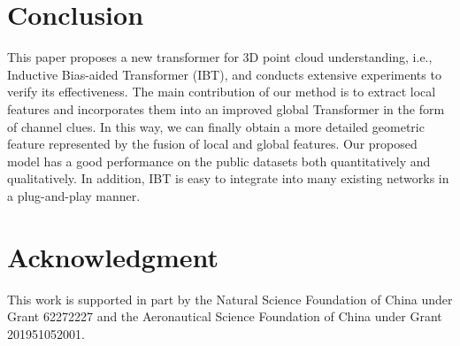 \documentclass[conference]{IEEEtran}
\begin{document}
\vspace{-3mm}
\begin{table}[h]
\caption{Ablation experiments for different options within the module.}
\centering
\vspace{-2mm}

\label{ab_in}
\end{table}




\vspace{-0.5cm}

\section{Conclusion} This paper proposes a new transformer for 3D point cloud understanding, i.e., Inductive Bias-aided Transformer (IBT), and conducts extensive experiments to verify its effectiveness. The main contribution of our method is to extract local features and incorporates them into  an improved global Transformer in the form of channel clues. In this way, we can finally obtain a more detailed geometric feature represented by the fusion of local and global features. Our proposed model has a good performance on the public datasets both quantitatively and qualitatively. In addition, IBT is easy to integrate into many existing networks in a plug-and-play manner.

\section*{Acknowledgment}
\vspace{-2mm}
This work is supported in part by  the Natural Science Foundation of China under Grant 62272227 and the Aeronautical Science Foundation of China under Grant 201951052001. 





\end{document}
